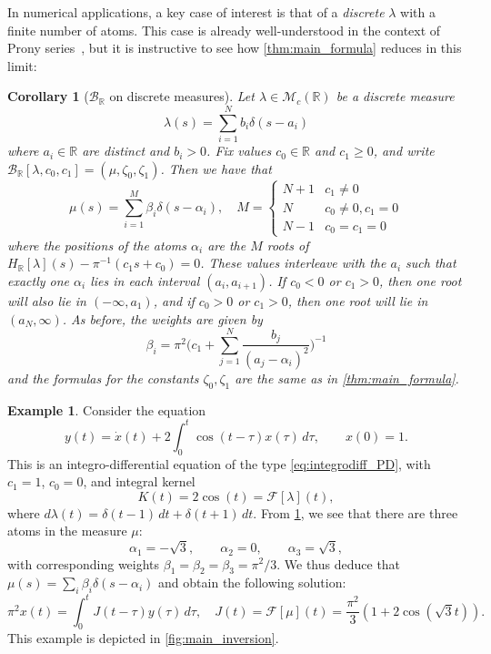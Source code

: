 \documentclass{cams-l} %
\newcommand{\RR}{\mathbb R}
\newcommand{\cM}{\mathcal M}
\newcommand{\cB}{\mathcal B}
\newcommand{\cF}{\mathcal F}
\newtheorem{corollary}[theorem]{Corollary}
\theoremstyle{definition}
\newtheorem{example}[theorem]{Example}
\theoremstyle{remark}
\numberwithin{equation}{section}
\begin{document}
In numerical applications, a key case of interest is that of a \emph{discrete} $\lambda$ with a finite number of atoms. This case is already well-understood in the context of Prony series~\cite{gross1968mathematical}, but it is instructive to see how \cref{thm:main_formula} reduces in this limit:
\begin{corollary}[$\cB_\RR$ on discrete measures]\label{cor:discrete_formula}
    Let $\lambda \in \cM_{c}(\RR)$ be a discrete measure
    \begin{equation}
        \lambda(s) = \sum_{i=1}^N b_i\delta(s - a_i)
    \end{equation}
    where $a_i \in \RR$ are distinct and $b_i > 0$. Fix values $c_0\in\RR$ and $c_1\geq 0$, and write $\cB_\RR[\lambda,c_0,c_1] = (\mu,\zeta_0,\zeta_1)$. Then we have that
    \begin{equation}
        \mu(s) = \sum_{i=1}^M \beta_i\delta(s - \alpha_i), \quad M = \begin{cases}N+1 & c_1 \neq 0\\N & c_0 \neq 0, c_1 = 0\\N-1 & c_0=c_1=0\end{cases}
    \end{equation}
    where the positions of the atoms $\alpha_i$ are the $M$ roots of $H_\RR[\lambda](s) - \pi^{-1}(c_1s + c_0) = 0$. These values interleave with the $a_i$ such that exactly one $\alpha_i$ lies in each interval $(a_i, a_{i+1})$. If $c_0 < 0$ or $c_1 > 0$, then one root will also lie in $(-\infty, a_1)$, and if $c_0 > 0$ or $c_1 > 0$, then one root will lie in $(a_N, \infty)$. As before, the weights are given by
    \begin{equation}
        \beta_i = \pi^2\Big(c_1 + \sum_{j=1}^N\frac{b_j}{(a_j - \alpha_i)^2}\Big)^{-1}
    \end{equation}
    and the formulas for the constants $\zeta_0, \zeta_1$ are the same as in \cref{thm:main_formula}.
\end{corollary}

\begin{example}\label{ex:gPD}
    Consider the equation
    \[y(t) = \dot{x}(t) + 2\int_0^t\cos(t-\tau)x(\tau)\,d\tau,\qquad x(0) = 1.\]
    This is an integro-differential equation of the type \ref{eq:integrodiff_PD}, with $c_1=1$, $c_0=0$, and integral kernel
    \[K(t) = 2\cos(t) = \cF[\lambda](t),\]
    where $d\lambda(t) = \delta(t-1)\,dt + \delta(t+1)\,dt$. From \cref{cor:discrete_formula}, we see that there are three atoms in the measure $\mu$:
    \[\alpha_1 = -\sqrt{3},\qquad \alpha_2 = 0,\qquad \alpha_3 = \sqrt{3},\]
    with corresponding weights $\beta_1 = \beta_2 =\beta_3 = \pi^2/3$. We thus deduce that $\mu(s) = \sum_i \beta_i\delta(s - \alpha_i)$ and obtain the following solution:
    \[\pi^2x(t) = \int_0^t J(t-\tau)y(\tau)\,d\tau, \quad J(t) = \cF[\mu](t) = \frac{\pi^2}{3}\left(1+2\cos(\sqrt{3}t)\right).\]
    This example is depicted in \cref{fig:main_inversion}.
\end{example}
\end{document}
